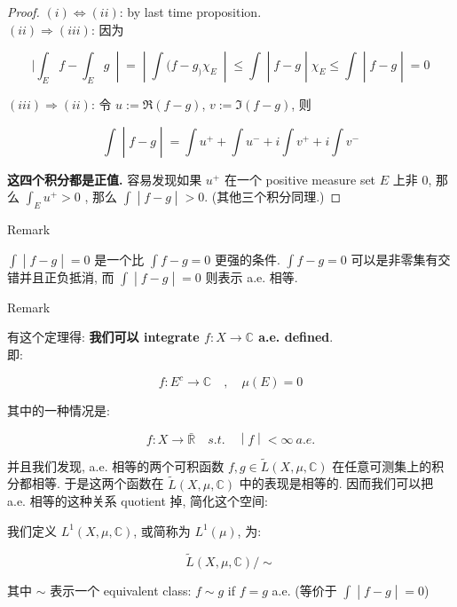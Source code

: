 \begin{proof}

\((i)\Leftrightarrow(ii)\): by last time proposition.\\
\((ii)\Longrightarrow(iii)\): 因为

\[\left. |\int_{E}f - \int_{E}g\  \middle| = \middle| \int(f - g_{)}\chi_{E}\  \middle| \leq \int \middle| f - g \middle| \chi_{E} \leq \int \middle| f - g \middle| = 0 \right.\]

\((iii)\Longrightarrow(ii)\): 令 \(u := \Re(f - g)\), \(v := \Im(f - g)\), 则

\[\left. \int \middle| f - g \middle| = \int u^{+} + \int u^{-} + i\int v^{+} + i\int v^{-} \right.\]

\textbf{这四个积分都是正值.} 容易发现如果 \(u^{+}\) 在一个 positive measure set \(E\) 上非 0, 那么 \(\int_{E}u^{+} > 0\) , 那么 \(\left. \int \middle| f - g \middle| > 0 \right.\). (其他三个积分同理.)

\end{proof}

\begin{qlremark}{Remark}

\(\left. \int \middle| f - g \middle| = 0 \right.\) 是一个比 \(\int f - g = 0\) 更强的条件. \(\int f - g = 0\) 可以是非零集有交错并且正负抵消, 而 \(\left. \int \middle| f - g \middle| = 0 \right.\) 则表示 a.e. 相等.

\end{qlremark}

\begin{qlremark}{Remark}

有这个定理得: \textbf{我们可以 integrate \(f:X\rightarrow\mathbb{C}\) a.e. defined}.\\
即:

\[f:E^{c}\rightarrow\mathbb{C}\quad,\quad\mu(E) = 0\]

其中的一种情况是:

\[\left. f:X\rightarrow\bar{\mathbb{R}}\quad s.t.\quad \middle| f \middle| < \infty\ a.e. \right.\]

\end{qlremark}

并且我们发现, a.e. 相等的两个可积函数 \(f,g \in \widetilde{L}(X,\mu,\mathbb{C})\) 在任意可测集上的积分都相等. 于是这两个函数在 \(\widetilde{L}(X,\mu,\mathbb{C})\) 中的表现是相等的. 因而我们可以把 a.e. 相等的这种关系 quotient 掉, 简化这个空间:

\begin{definition}{}

我们定义 \(L^{1}(X,\mu,\mathbb{C})\), 或简称为 \(L^{1}(\mu)\), 为:

\[\widetilde{L}(X,\mu,\mathbb{C})/ \sim\]

其中 \(\sim\) 表示一个 equivalent class: \(f \sim g\) if \(f = g\) a.e. (等价于 \(\left. \int \middle| f - g \middle| = 0 \right.\))

\end{definition}

